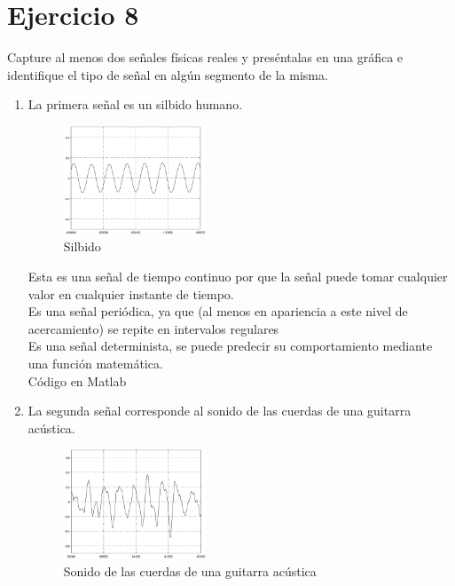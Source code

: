 \documentclass[10pt,a4paper]{report}
\begin{document}
\section{Ejercicio 8}
Capture al menos dos señales físicas reales y preséntalas en una  gráfica e identifique el tipo de señal en algún segmento de la misma.
\begin{enumerate}
  \item La primera señal es un silbido humano.
    \begin{figure}[H]
      \begin{center}
        \includegraphics[width=0.4\textwidth]{./Ejercicio8/Silbido}
        \caption{Silbido}
        \label{fig:Slib}
      \end{center}
    \end{figure}
Esta es una señal de tiempo continuo por que la señal puede tomar cualquier valor en cualquier instante de tiempo. \\
Es una señal periódica, ya que (al menos en apariencia a este nivel de acercamiento) se repite en intervalos regulares \\
Es una señal determinista, se puede predecir su comportamiento mediante una función matemática.\\
\newline Código en Matlab
    
\item La segunda señal corresponde al sonido de las cuerdas de una guitarra acústica.
\begin{figure}[H]
  \begin{center}
    \includegraphics[width=0.4\textwidth]{./Ejercicio8/Guitarra}
    \caption{Sonido de las cuerdas de una guitarra acústica}
    \label{fig:Guitar}
  \end{center}
\end{figure}


\end{enumerate}
\end{document}
